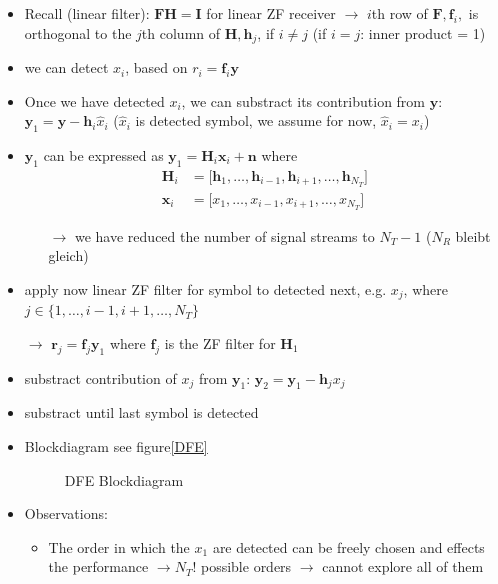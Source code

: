 \documentclass[a4paper, 10pt]{article}
\begin{document}
\begin{itemize}
	\item Recall (linear filter): $\mathbf{FH} = \mathbf{I} $ for linear ZF receiver $\rightarrow$ $i$th row of $\mathbf{F}, \mathbf{f}_i, $ is orthogonal to the $j$th column of $\mathbf{H}, \mathbf{h}_j$, if $ i \neq j$ (if $i = j$: inner product = 1)  
	\item we can detect $x_i$, based on $r_i = \mathbf{f}_i\mathbf{y} $
	\item Once we have detected $x_i$, we can substract its contribution from $\mathbf{y}$: $\mathbf{y}_1 = \mathbf{y} - \mathbf{h}_i\hat{x}_i$ ($\hat{x}_i $ is detected symbol, we assume for now, $\hat{x}_i = x_i $) 
	\item $\mathbf{y}_1 $ can be expressed as $ \mathbf{y}_1 = \mathbf{H}_i\mathbf{x}_i + \mathbf{n}$ where 
	\begin{align*}
		\mathbf{H}_i &= \bigl[\mathbf{h}_1, \dots ,\mathbf{h}_{i-1},\mathbf{h}_{i+1},\dots ,\mathbf{h}_{N_T} \bigr] \\
		\mathbf{x}_i &= \bigl[x_1, \dots , x_{i-1}, x_{i+1}, \dots ,x_{N_T}\bigr]
	\end{align*}
	\begin{itemize}
		\item[$\rightarrow$] we have reduced the number of signal streams to $N_T - 1$ ($N_R $ bleibt gleich)
	\end{itemize}
	\item apply now linear ZF filter for symbol to detected next, e.g. $x_j $, where $ j\in \bigl\{1, \dots ,i - 1, i + 1, \dots , N_T\bigr\} $
	\item[$\rightarrow$] $ \mathbf{r}_j = \mathbf{f}_j\mathbf{y}_1 $ where $\mathbf{f}_j $ is the ZF filter for $\mathbf{H}_1$ 
	\item substract contribution of $x_j $ from $\mathbf{y}_1 $: $\mathbf{y}_2 = \mathbf{y}_1 - \mathbf{h}_j x_j $
	\item substract until last symbol is detected
	\item Blockdiagram see figure\ref{DFE} 
	\begin{figure}[h]
		\centering
		\resizebox{\textwidth}{!}{}
		\caption{DFE Blockdiagram}
		\label{fig:DFE.pstex_t}
	\end{figure}
	\item Observations:
	\begin{itemize}
		\item The order in which the $x_1 $ are detected can be freely chosen and effects the performance $\rightarrow  N_T! $ possible orders $\rightarrow$ cannot explore all of them

\end{itemize}
\end{itemize}
\end{document}
